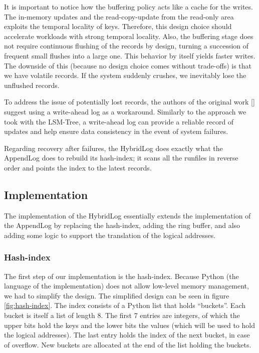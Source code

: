 It is important to notice how the buffering policy acts like a cache for the writes.
The in-memory updates and the read-copy-update from the read-only area exploits the temporal locality of keys.
Therefore, this design choice should accelerate workloads with strong temporal locality. Also, the buffering stage does not require continuous flushing of the records by design, turning a succession of frequent small flushes into a large one. This behavior by itself yields faster writes. The downside of this (because no design choice comes without trade-offs) is that we have volatile records. If the system suddenly crushes, we inevitably lose the unflushed records.

To address the issue of potentially lost records, the authors of the original work [\cite{faster}] suggest using a write-ahead log as a workaround.
Similarly to the approach we took with the LSM-Tree, a write-ahead log can provide a reliable record of updates and help ensure data consistency in the event of system failures.

Regarding recovery after failures, the HybridLog does exactly what the AppendLog does to rebuild its hash-index; it scans all the runfiles in reverse order and points the index to the latest records.

\subsection{Implementation}

The implementation of the HybridLog essentially extends the implementation of the AppendLog by replacing the hash-index, adding the ring buffer, and also adding some logic to support the translation of the logical addresses.

\subsubsection{Hash-index}

The first step of our implementation is the hash-index. Because Python (the language of the implementation) does not allow low-level memory management, we had to simplify the design.
The simplified design can be seen in figure \ref{fig:hash-index}.
The index consists of a Python list that holds ``buckets''.
Each bucket is itself a list of length 8. The first 7 entries are integers, of which the upper bits hold the keys and the lower bits the values (which will be used to hold the logical addresses). The last entry holds the index of the next bucket, in case of overflow.
New buckets are allocated at the end of the list holding the buckets.

